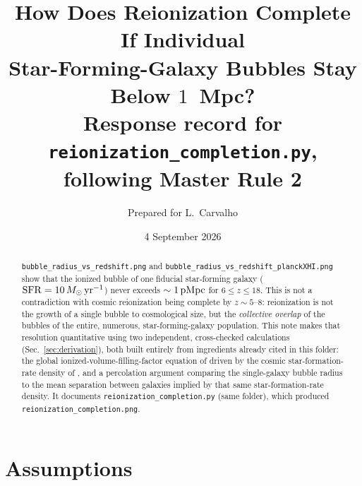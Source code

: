 \documentclass[11pt,a4paper]{article}
\title{\bf How Does Reionization Complete If Individual\\ Star-Forming-Galaxy Bubbles Stay Below $1$~Mpc?\\[2mm]
\large Response record for \texttt{reionization\_completion.py}, following Master Rule 2}
\author{Prepared for L.\ Carvalho}
\date{4 September 2026}
\newcommand{\pMpc}{\,{\rm pMpc}}
\newcommand{\Msun}{\,M_\odot}
\begin{document}
\maketitle

\begin{abstract}
\noindent
\texttt{bubble\_radius\_vs\_redshift.png} and \texttt{bubble\_radius\_vs\_redshift\_planckXHI.png} show that
the ionized bubble of one fiducial star-forming galaxy ($\mathrm{SFR}=10\Msun\,{\rm yr^{-1}}$) never exceeds
$\sim1\pMpc$ for $6\le z\le18$. This is not a contradiction with cosmic reionization being complete by
$z\sim5$--$8$: reionization is not the growth of a single bubble to cosmological size, but the
\emph{collective overlap} of the bubbles of the entire, numerous, star-forming-galaxy population. This note
makes that resolution quantitative using two independent, cross-checked calculations
(Sec.~\ref{sec:derivation}), both built entirely from ingredients already cited in this folder: the global
ionized-volume-filling-factor equation of \citet{Choudhury2022} driven by the cosmic star-formation-rate
density of \citet{MadauDickinson2014}, and a percolation argument comparing the single-galaxy bubble radius
to the mean separation between galaxies implied by that same star-formation-rate density. It documents
\texttt{reionization\_completion.py} (same folder), which produced \texttt{reionization\_completion.png}.
\end{abstract}

\tableofcontents

\section{Assumptions}
\label{sec:assumptions}
\end{document}
